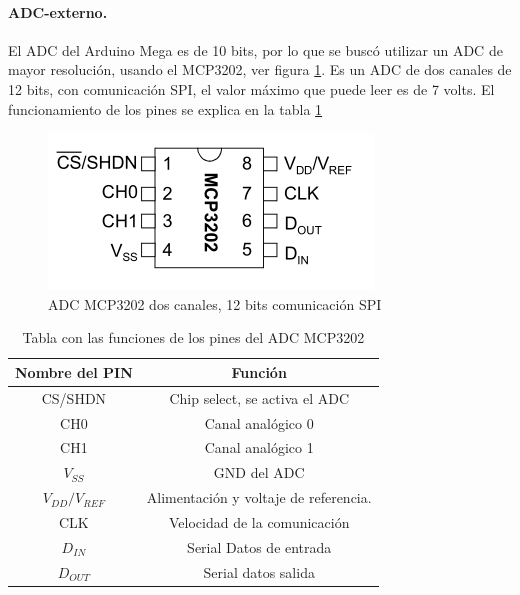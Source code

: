 \paragraph{ADC-externo.}
El ADC del Arduino Mega es de 10 bits, por lo que se buscó utilizar un ADC de mayor resolución, usando el MCP3202, ver figura \ref{fig:mcp3202}. Es un ADC de dos canales de 12 bits, con comunicación SPI, el valor máximo que puede leer es de 7 volts. El funcionamiento de los pines se explica en la tabla \ref{tabla:ADC}

\begin{figure}[h]
	\centering
	\includegraphics[width=0.5\linewidth]{Imagenes/2/MCP3202}
	\caption{ADC MCP3202 dos canales, 12 bits comunicación SPI \cite{MCP3202}}
	\label{fig:mcp3202}
\end{figure}

\begin{table}[h]
	\centering
	\caption{Tabla con las funciones de los pines del ADC MCP3202 \cite{MCP3202}}
\begin{tabular}{|c|c|}
	\hline 
	Nombre del PIN & Función  \\ 
	\hline 
	CS/SHDN & Chip select, se activa el ADC \\ 
	\hline 
	CH0 & Canal analógico 0 \\ 
	\hline 
	CH1 & Canal analógico 1 \\ 
	\hline 
	$V_{SS}$ & GND del ADC \\
	\hline
	$V_{DD}/V_{REF}$ & Alimentación y voltaje de referencia. \\  
	\hline
	CLK & Velocidad de la comunicación  \\ 
	\hline 
	$D_{IN}$ & Serial Datos de entrada \\ 
	\hline 
	$D_{OUT}$ & Serial datos salida \\ 
	\hline 

\end{tabular} 
	\label{tabla:ADC}
\end{table}


